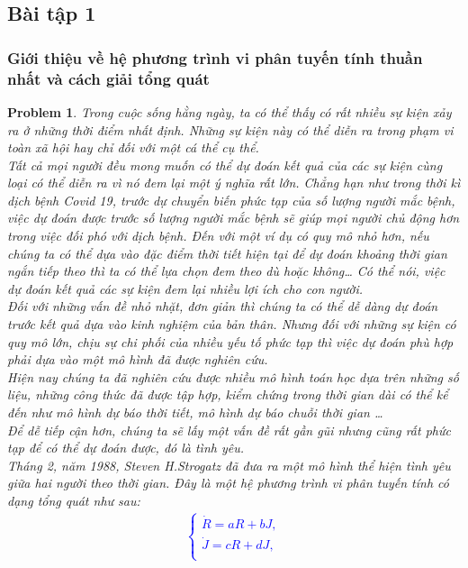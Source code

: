 \documentclass[a4paper]{article}
\newtheorem*{problem}{Problem}
\begin{document}
	\subsection{Bài tập 1}
 \subsubsection{Giới thiệu về hệ phương trình vi phân tuyến tính thuần nhất và cách giải tổng quát}
	\begin{problem}
	    Trong cuộc sống hằng ngày, ta có thể thấy có rất nhiều sự kiện xảy ra ở những thời điểm nhất định. Những sự kiện này có thể diễn ra trong phạm vi toàn xã hội hay chỉ đối với một cá thể cụ thể. \\
Tất cả mọi người đều mong muốn có thể dự đoán kết quả của các sự kiện cùng loại có thể diễn ra vì nó đem lại một ý nghĩa rất lớn. Chẳng hạn như trong thời kì dịch bệnh Covid 19, trước dự chuyển biến phức tạp của số lượng người mắc bệnh, việc dự đoán được trước số lượng người mắc bệnh sẽ giúp mọi người chủ động hơn trong việc đối phó với dịch bệnh. Đến với một ví dụ có quy mô nhỏ hơn, nếu chúng ta có thể dựa vào đặc điểm thời tiết hiện tại để dự đoán khoảng thời gian ngắn tiếp theo thì ta có thể lựa chọn đem theo dù hoặc không… Có thể nói, việc dự đoán kết quả các sự kiện đem lại nhiều lợi ích cho con người.\\
Đối với những vấn đề nhỏ nhặt, đơn giản thì chúng ta có thể dễ dàng dự đoán trước kết quả dựa vào kinh nghiệm của bản thân. Nhưng đối với những sự kiện có quy mô lớn, chịu sự chi phối của nhiều yếu tố phức tạp thì việc dự đoán phù hợp phải dựa vào một mô hình đã được nghiên cứu.\\
Hiện nay chúng ta đã nghiên cứu được nhiều mô hình toán học dựa trên những số liệu, những công thức đã được tập hợp, kiểm chứng trong thời gian dài có thể kể đến như mô hình dự báo thời tiết, mô hình dự báo chuỗi thời gian …\\
Để dễ tiếp cận hơn, chúng ta sẽ lấy một vấn đề rất gần gũi nhưng cũng rất phức tạp để có thể dự đoán được, đó là tình yêu.\\
Tháng 2, năm 1988, Steven H.Strogatz đã đưa ra một mô hình thể hiện tình yêu giữa hai người theo thời gian. Đây là một hệ phương trình vi phân tuyến tính có dạng tổng quát như sau:
     \textcolor{blue}{
    \begin{align}\label{model}
        \begin{cases}
        \dot{R} = aR + bJ,\\
        \dot{J}=cR+dJ,\\

\end{cases}
\end{align}}
\end{problem}
\end{document}
